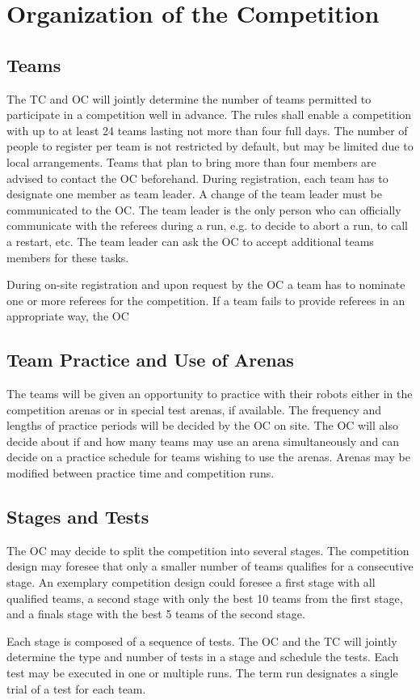 
\section{Organization of the Competition}\label{sec:organization_of_the_competition}

\subsection{Teams}
The TC and OC will jointly determine the number of teams permitted to participate in a competition well in advance. The rules shall enable a competition with up to at least 24 teams lasting not more than four full days.
The number of people to register per team is not restricted by default, but may be limited due to local arrangements. Teams that plan to bring more than four members are advised to contact the OC beforehand.
During registration, each team has to designate one member as team leader. A change of the team leader must be communicated to the OC. The team leader is the only person who can officially communicate with the referees during a run, e.g. to decide to abort a run, to call a restart, etc. The team leader can ask the OC to accept additional teams members for these tasks.
\par
During on-site registration and upon request by the OC a team has to nominate one or more referees for the competition. If a team fails to provide referees in an appropriate way, the OC 


\subsection{Team Practice and Use of Arenas}
The teams will be given an opportunity to practice with their robots either in the competition arenas or in special test arenas, if available. The frequency and lengths of practice periods will be decided by the OC on site. The OC will also decide about if and how many teams may use an arena simultaneously and can decide on a practice schedule for teams wishing to use the arenas. Arenas may be modified between practice time and competition runs.

\subsection{Stages and Tests}
The OC may decide to split the competition into several stages. The competition design may foresee that only a smaller number of teams qualifies for a consecutive stage. An exemplary competition design could foresee a first stage with all qualified teams, a second stage with only the best 10 teams from the first stage, and a finals stage with the best 5 teams of the second stage.
\par
Each stage is composed of a sequence of tests. The OC and the TC will jointly determine the type and number of tests in a stage and schedule the tests.
Each test may be executed in one or multiple runs. The term run designates a single trial of a test for each team.

